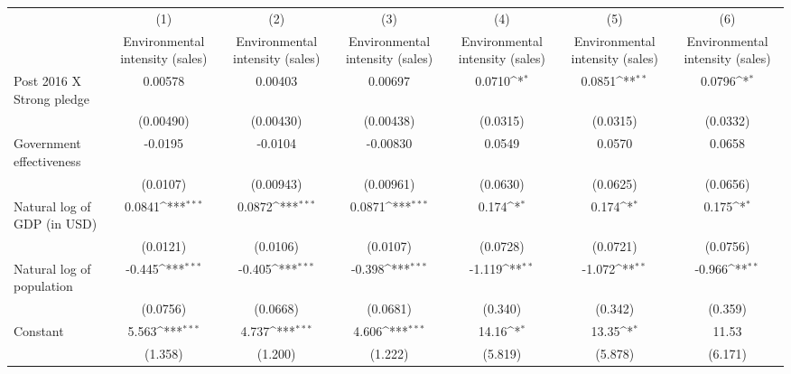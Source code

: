{
\def\sym#1{\ifmmode^{#1}\else\(^{#1}\)\fi}
\begin{tabular}{l*{6}{c}}
\hline\hline
                    &\multicolumn{1}{c}{(1)}&\multicolumn{1}{c}{(2)}&\multicolumn{1}{c}{(3)}&\multicolumn{1}{c}{(4)}&\multicolumn{1}{c}{(5)}&\multicolumn{1}{c}{(6)}\\
                    &\multicolumn{1}{c}{Environmental intensity (sales)}&\multicolumn{1}{c}{Environmental intensity (sales)}&\multicolumn{1}{c}{Environmental intensity (sales)}&\multicolumn{1}{c}{Environmental intensity (sales)}&\multicolumn{1}{c}{Environmental intensity (sales)}&\multicolumn{1}{c}{Environmental intensity (sales)}\\
\hline
Post 2016 X Strong pledge&     0.00578         &     0.00403         &     0.00697         &      0.0710\sym{*}  &      0.0851\sym{**} &      0.0796\sym{*}  \\
                    &   (0.00490)         &   (0.00430)         &   (0.00438)         &    (0.0315)         &    (0.0315)         &    (0.0332)         \\
[1em]
Government effectiveness&     -0.0195         &     -0.0104         &    -0.00830         &      0.0549         &      0.0570         &      0.0658         \\
                    &    (0.0107)         &   (0.00943)         &   (0.00961)         &    (0.0630)         &    (0.0625)         &    (0.0656)         \\
[1em]
Natural log of GDP (in USD)&      0.0841\sym{***}&      0.0872\sym{***}&      0.0871\sym{***}&       0.174\sym{*}  &       0.174\sym{*}  &       0.175\sym{*}  \\
                    &    (0.0121)         &    (0.0106)         &    (0.0107)         &    (0.0728)         &    (0.0721)         &    (0.0756)         \\
[1em]
Natural log of population&      -0.445\sym{***}&      -0.405\sym{***}&      -0.398\sym{***}&      -1.119\sym{**} &      -1.072\sym{**} &      -0.966\sym{**} \\
                    &    (0.0756)         &    (0.0668)         &    (0.0681)         &     (0.340)         &     (0.342)         &     (0.359)         \\
[1em]
Constant            &       5.563\sym{***}&       4.737\sym{***}&       4.606\sym{***}&       14.16\sym{*}  &       13.35\sym{*}  &       11.53         \\
                    &     (1.358)         &     (1.200)         &     (1.222)         &     (5.819)         &     (5.878)         &     (6.171)         \\

\end{tabular}}
